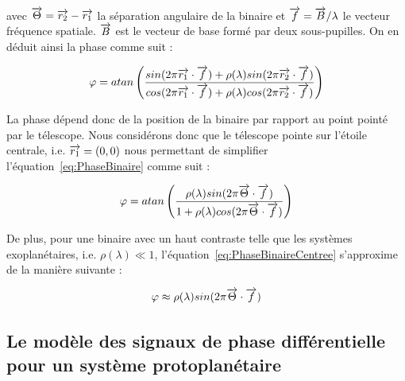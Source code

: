 avec $\overrightarrow{\Theta} = \overrightarrow{r_2} - \overrightarrow{r_1}$ la séparation angulaire de la binaire et $\overrightarrow{f} = \overrightarrow{B} / \lambda$ le vecteur fréquence spatiale. $\overrightarrow{B}$ est le vecteur de base formé par deux sous-pupilles. On en déduit ainsi la phase comme suit :

\begin{equation}
    \varphi = atan \left( \frac{sin(2\pi \overrightarrow{r_1} \cdot \overrightarrow{f}) + \rho(\lambda) sin(2\pi \overrightarrow{r_2} \cdot \overrightarrow{f})}{cos(2\pi \overrightarrow{r_1} \cdot \overrightarrow{f}) + \rho(\lambda) cos(2\pi \overrightarrow{r_2} \cdot \overrightarrow{f})} \right) \label{eq:PhaseBinaire}
\end{equation}

La phase dépend donc de la position de la binaire par rapport au point pointé par le télescope. Nous considérons donc que le télescope pointe sur l'étoile centrale, i.e. $\overrightarrow{r_1} = (0, 0)$ nous permettant de simplifier l'équation~\ref{eq:PhaseBinaire} comme suit :

\begin{equation}
    \varphi = atan \left( \frac{\rho(\lambda) sin(2\pi \overrightarrow{\Theta} \cdot \overrightarrow{f})}{1 + \rho(\lambda) cos(2\pi \overrightarrow{\Theta} \cdot \overrightarrow{f})} \right) \label{eq:PhaseBinaireCentree}
\end{equation}

De plus, pour une binaire avec un haut contraste telle que les systèmes exoplanétaires, i.e. $\rho(\lambda) \ll 1$, l'équation~\ref{eq:PhaseBinaireCentree} s'approxime de la manière suivante :

\begin{equation}
    \varphi \approx \rho(\lambda) sin(2\pi \overrightarrow{\Theta} \cdot \overrightarrow{f})
    \label{eq:PhaseBinaireHautContraste}
\end{equation}


\subsection{Le modèle des signaux de phase différentielle pour un système protoplanétaire}

